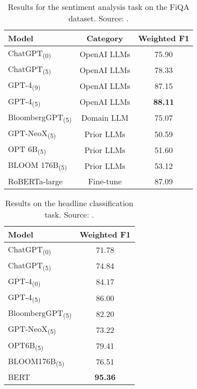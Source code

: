 \begin{table}[!h]
	\centering
	\begin{tabularx}{0.8\textwidth}{Xcc}
		\toprule
		\textbf{Model}                  & \textbf{Category} & \textbf{Weighted F1} \\
		\midrule
		ChatGPT\textsubscript{(0)}      & OpenAI LLMs       & 75.90                \\
		ChatGPT\textsubscript{(5)}      & OpenAI LLMs       & 78.33                \\
		GPT-4\textsubscript{(9)}        & OpenAI LLMs       & 87.15                \\
		GPT-4\textsubscript{(5)}        & OpenAI LLMs       & \textbf{88.11}       \\
		\addlinespace
		BloombergGPT\textsubscript{(5)} & Domain LLM        & 75.07                \\
		\addlinespace
		GPT-NeoX\textsubscript{(5)}     & Prior LLMs        & 50.59                \\
		OPT 6B\textsubscript{(5)}       & Prior LLMs        & 51.60                \\
		BLOOM 176B\textsubscript{(5)}   & Prior LLMs        & 53.12                \\
		\addlinespace
		RoBERTa-large                   & Fine-tune         & 87.09                \\
		\bottomrule
	\end{tabularx}
	\caption{Results for the sentiment analysis task on the FiQA dataset. Source: \textcite{li2023chatgpt}.}
	\label{tab:fiqa_results}
\end{table}

\begin{table}[!h]
	\centering
	\begin{tabularx}{0.8\textwidth}{Xc}
		\toprule
		\textbf{Model}                  & \textbf{Weighted F1} \\
		\midrule
		ChatGPT\textsubscript{(0)}      & 71.78                \\
		ChatGPT\textsubscript{(5)}      & 74.84                \\
		GPT-4\textsubscript{(0)}        & 84.17                \\
		GPT-4\textsubscript{(5)}        & 86.00                \\
		BloombergGPT\textsubscript{(5)} & 82.20                \\
		GPT-NeoX\textsubscript{(5)}     & 73.22                \\
		OPT6B\textsubscript{(5)}        & 79.41                \\
		BLOOM176B\textsubscript{(5)}    & 76.51                \\
		BERT                            & \textbf{95.36}       \\
		\bottomrule
	\end{tabularx}
	\caption{Results on the headline classification task. Source: \textcite{li2023chatgpt}.}
	\label{tab:headline_classification}
\end{table}

